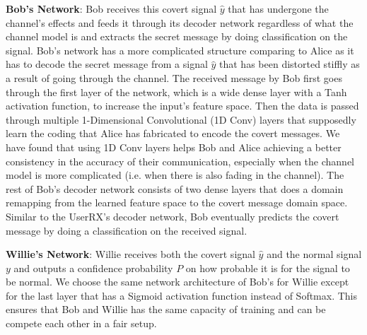 \textbf{Bob's Network}: Bob receives this covert signal \(\hat{y}\) that has undergone the channel's effects and feeds it through its decoder network regardless of what the channel model is and extracts the secret message by doing classification on the signal. Bob's network has a more complicated structure comparing to Alice as it has to decode the secret message from a signal \(\hat{y}\) that has been distorted stiffly as a result of going through the channel. The received message by Bob first goes through the first layer of the network, which is a wide dense layer with a Tanh activation function, to increase the input's feature space. Then the data is passed through multiple 1-Dimensional Convolutional (1D Conv) layers that supposedly learn the coding that Alice has fabricated to encode the covert messages. We have found that using 1D Conv layers helps Bob and Alice achieving a better consistency in the accuracy of their communication, especially when the channel model is more complicated (i.e. when there is also fading in the channel). The rest of Bob's decoder network consists of two dense layers that does a domain remapping from the learned feature space to the covert message domain space. Similar to the UserRX's decoder network, Bob eventually predicts the covert message by doing a classification on the received signal.


\textbf{Willie's Network}: Willie receives both the covert signal \(\hat{y}\) and the normal signal \(y\) and outputs a confidence probability \(P\) on how probable it is for the signal to be normal. We choose the same network architecture of Bob's for Willie except for the last layer that has a Sigmoid activation function instead of Softmax. This ensures that Bob and Willie has the same capacity of training and can be compete each other in a fair setup.



